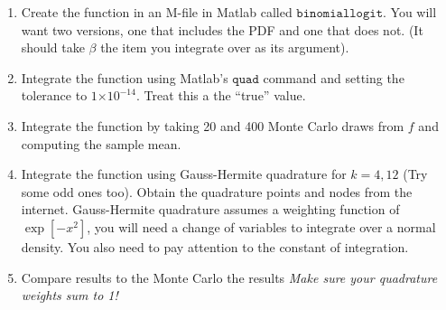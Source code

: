 \documentclass{article}
\providecommand{\e}[1]{\ensuremath{\times 10^{#1}}}
\begin{document}
\begin{enumerate}
\item Create the function in an M-file in Matlab called $\mathtt{binomiallogit}$. You will want two versions, one that includes the PDF and one that does not. (It should take $\beta$ the item you integrate over as its argument).
\begin{comment}
\begin{verbatim}
function f=binomiallogit(beta)
     X=0.5; mu = 0.5; sigma =2;
     beta = beta*sigma*sqrt(2)+mu;
     f=exp(beta*X)./(1+exp(beta*X));
end


function f=binomiallogit(beta)
     X=0.5; mu = 0.5; sigma =2;
     f=exp(beta*X)./(1+exp(beta*X)) .* normpdf(beta,mu,sigma);
end
\end{verbatim}
\end{comment}

\item Integrate the function using Matlab's $\mathtt{quad}$ command and setting the tolerance to $1\e{-14}$.  Treat this a the ``true'' value.
\begin{comment}
\begin{verbatim}
[Ftrue,nevals]=quad(@binomiallogit,-10,10,1e-14);
z=randn(100,1);
Fmc=sum(binomiallogitnopdf(z))./length(z);
Fgh=binomiallogitnopdf(x)'*(w./sum(w));
\end{verbatim}
\end{comment}

\item Integrate the function by taking 20 and 400 Monte Carlo draws from $f$ and computing the sample mean.
\item Integrate the function using Gauss-Hermite quadrature for $k=4, 12$ (Try some odd ones too). Obtain the quadrature points and nodes from the internet. Gauss-Hermite quadrature assumes a weighting function of $\exp[-x^2]$, you will need a change of variables to integrate over a normal density. You also need to pay attention to the constant of integration.
\item Compare results to the Monte Carlo the results \textit{Make sure your quadrature weights sum to 1!}
\begin{comment}
\begin{table}[htdp]
\caption{True value: 0.5515}
\begin{center}
\begin{tabular}{l r r r }
Method & Points & Error\\
quad & 2597 & 1e-14 \\
monte carlo & 100 & 0.0166\\
Gauss Hermite & 4 & 0.0044234\\
Gauss Hermite & 12 & 0.0044469\\
\end{tabular}
\end{center}
\end{table}
\end{comment}


\end{enumerate}
\end{document}
